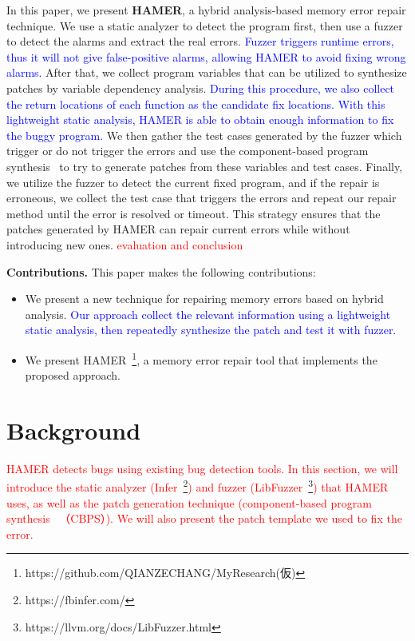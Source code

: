 \documentclass[a4j,dvipdfmx]{article}
\begin{document}
In this paper, we present \textbf{HAMER}, a hybrid analysis-based memory error repair \mbox{technique}. We use a static analyzer to detect the program first, then use a fuzzer to detect the alarms and extract the real errors. \textcolor{blue}{Fuzzer triggers runtime errors, thus it will not give false-positive alarms, allowing HAMER to avoid fixing wrong alarms.} After that, we collect program variables that can be utilized to synthesize patches by variable dependency analysis. \textcolor{blue}{During this procedure, we also collect the return locations of each function as the candidate fix locations. With this lightweight static analysis, HAMER is able to obtain enough information to fix the buggy program.} We then gather the test cases generated by the fuzzer which trigger or do not trigger the errors and use the component-based program synthesis~\cite{oracle} to try to generate patches from these variables and test cases. Finally, we utilize the fuzzer to detect the current fixed program, and if the repair is erroneous, we collect the test case that triggers the errors and repeat our repair method until the error is resolved or timeout. This strategy ensures that the patches generated by HAMER can repair current errors while without introducing new ones. \textcolor{red}{evaluation and conclusion}

\textbf{Contributions.} This paper makes the following contributions:
\begin{itemize}
  \item We present a new technique for repairing memory errors based on hybrid analysis. \textcolor{blue}{Our approach collect the relevant information using a lightweight static analysis, then repeatedly synthesize the patch and test it with fuzzer.}
  \item We present HAMER~\footnote{https://github.com/QIANZECHANG/MyResearch(仮)}, a memory error repair tool that implements the proposed approach.
\end{itemize}

\section{Background}
\textcolor{red}{
HAMER detects bugs using existing bug detection tools. In this section, we will introduce the static analyzer (Infer~\footnote{https://fbinfer.com/}) and fuzzer (LibFuzzer~\footnote{https://llvm.org/docs/LibFuzzer.html}) that HAMER uses, as well as the patch generation technique (component-based program synthesis~\cite{oracle} （CBPS）). We will also present the patch template we used to fix the error.
}
\end{document}
